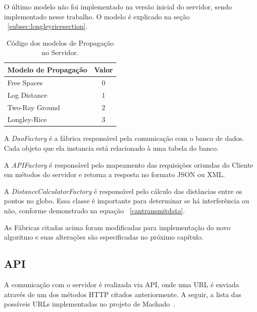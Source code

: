 O último modelo não foi implementado na versão inicial do servidor, sendo implementado nesse trabalho. O modelo é explicado na seção ~\ref{subsec:longleyricesection}.

\begin{table}[modelnumbers]
\centering
\caption[Código dos modelos de Propagação no Servidor.]
{Código dos modelos de Propagação no Servidor.} 
\label{table:modelnumbers}
\begin{tabular}{lc}
Modelo de Propagação          & Valor            \\ \hline
Free Spaces                   & 0                \\
Log Distance                  & 1                \\
Two-Ray Ground                & 2                \\
Longley-Rice                  & 3                        
\end{tabular}
\end{table}

A \textit{DaoFactory} é a fábrica responsável pela comunicação com o banco de dados. Cada objeto que ela instancia está relacionado à uma tabela do banco.

A \textit{APIFactory} é responsável pelo mapeamento das requisições oriundas do Cliente em métodos do servidor e retorna a resposta no formato JSON ou XML.

A \textit{DistanceCalculatorFactory} é responsável pelo cálculo das distâncias entre os pontos no globo. Essa classe é importante para determinar se há interferência ou não, conforme demonstrado na equação ~\ref{cantransmitdata}.

As Fábricas citadas acima foram modificadas para implementação do novo algoritmo e suas alterações são especificadas no próximo capítulo.

\subsection{API}

A comunicação com o servidor é realizada via API, onde uma URL é enviada através de um dos métodos HTTP citados anteriormente. A seguir, a lista das possíveis URLs implementadas no projeto de Machado~\cite{tccmarcelo}. 

